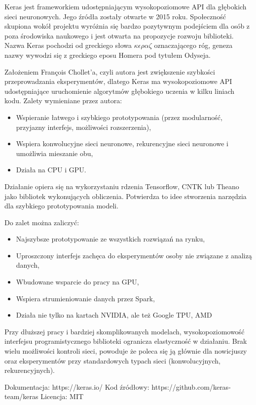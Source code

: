 \documentclass[12pt,a4paper,twoside,titlepage,openright]{book}
\begin{document}
Keras jest frameworkiem udostępniającym wysokopoziomowe API dla głębokich sieci neuronowych. Jego źródła zostały otwarte w 2015 roku. Społeczność skupiona wokół projektu wyróżnia się bardzo pozytywnym podejściem dla osób z poza środowiska naukowego i jest otwarta na propozycje rozwoju biblioteki. Nazwa Keras pochodzi od greckiego słowa \(\kappa\epsilon\rho\alpha\zeta\) oznaczającego róg, geneza nazwy wywodzi się z greckiego eposu Homera pod tytułem Odyseja.

Założeniem François Chollet'a, czyli autora jest zwiększenie szybkości przeprowadzania eksperymentów, dlatego Keras ma wysokopoziomowe API udostępniające uruchomienie algorytmów głębokiego uczenia w kilku liniach kodu. Zalety wymieniane przez autora:
\begin{itemize}
\item Wspieranie łatwego i szybkiego prototypowania (przez modularność, przyjazny interfejs, możliwości rozszerzenia),
\item Wspiera konwolucyjne sieci neuronowe, rekurencyjne sieci neuronowe i umożliwia mieszanie obu,
\item Działa na CPU i GPU.
\end{itemize}

Działanie opiera się na wykorzystaniu rdzenia Tensorflow, CNTK lub Theano jako bibliotek wykonujących obliczenia. Potwierdza to idee stworzenia narzędzia dla szybkiego prototypowania modeli. \cite{bookDeepLearningKeras}

Do zalet można zaliczyć:
\begin{itemize}
\item Najszybsze prototypowanie ze wszystkich rozwiązań na rynku,
\item Uproszczony interfejs zachęca do eksperymentów osoby nie związane z analizą danych,
\item Wbudowane wsparcie do pracy na GPU,
\item Wspiera strumieniowanie danych przez Spark,
\item Działa nie tylko na kartach NVIDIA, ale też Google TPU, AMD
\end{itemize}

Przy dłuższej pracy i bardziej skomplikowanych modelach, wysokopoziomowość interfejsu programistycznego biblioteki ogranicza elastyczność w działaniu. Brak wielu możliwości kontroli sieci, powoduje że poleca się ją głównie dla nowicjuszy oraz eksperymentów przy standardowych typach sieci (konwolucyjnych, rekurencyjnych).

\noindent
\newline 
Dokumentacja: https://keras.io/
\newline 
Kod źródłowy: https://github.com/keras-team/keras
\newline 
Licencja: MIT
\end{document}
